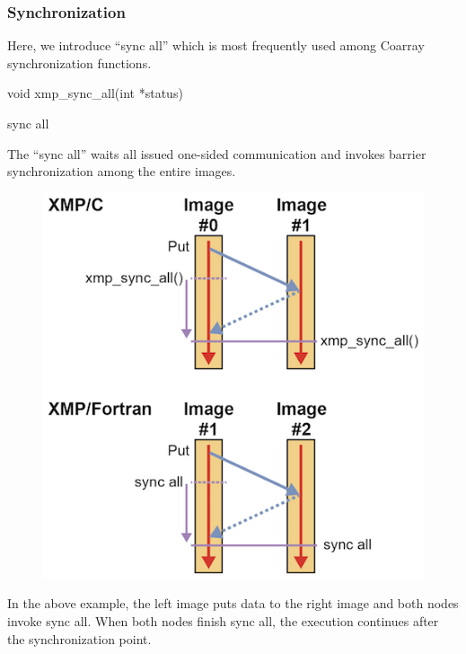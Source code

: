 \subsubsection{Synchronization}

Here, we introduce ``sync all'' which is most frequently used among
Coarray synchronization functions.

\begin{XCexample}
void xmp_sync_all(int *status)
\end{XCexample}

\begin{XFexample}
sync all
\end{XFexample}

The ``sync all'' waits all issued one-sided communication and invokes
barrier synchronization among the entire images.

\begin{figure}
  \centering
  \includegraphics{figs/sync_all.png}
\end{figure}

In the above example, the left image puts data to the right image and
both nodes invoke sync all. When both nodes finish sync all, the
execution continues after the synchronization point.


